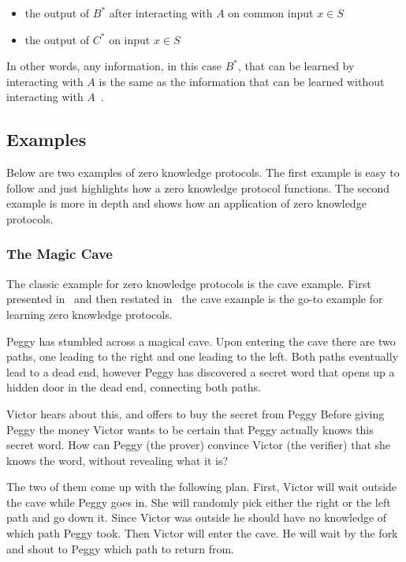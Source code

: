 \documentclass{sig-alternate}
\begin{document}
	\begin{itemize}
		\item the output of $B^{*}$ after interacting with $A$ on common input
		$x \in S$
				
		\item the output of $C^{*}$ on input $x \in S$
	\end{itemize}						
			
	In other words, any information, in this case $B^{*}$, that can be learned by
	interacting with $A$ is the same as the information that can be learned 
	without interacting with $A$~\cite{Survey}.

	\subsection{Examples}
	
	Below are two examples of zero knowledge protocols. The first
	example is easy to follow and just highlights how a zero knowledge
	protocol functions. The second example is more in depth and shows
	how an application of zero knowledge protocols.
	
	\subsubsection{The Magic Cave}
	The classic example for zero knowledge protocols is the cave example.
	First presented in~\cite{Children:1987} and then restated
	in~\cite{Survey} the cave example is the go-to example for learning
	zero knowledge protocols.

	Peggy has stumbled across a magical cave. Upon entering the cave
	there are two paths, one leading to the right and one leading to the
	left. Both paths eventually lead to a dead end, however Peggy has
	discovered a secret word that opens up a hidden door in the dead end,
	connecting both paths.

	Victor hears about this, and offers to buy the secret from Peggy
	Before giving Peggy the money Victor
	wants to be certain that Peggy actually knows this secret word. How can
	Peggy (the prover) convince Victor (the verifier) that she knows the
	word, without revealing what it is?

	The two of them come up with the following plan. First, Victor will wait
	outside the cave while Peggy goes in. She will randomly pick either the
	right or the left path and go down it. Since Victor was outside he
	should have no knowledge of which path Peggy took. Then Victor will
	enter the cave. He will wait by the fork and shout to Peggy which
	path to return from. 
	
\end{document}
